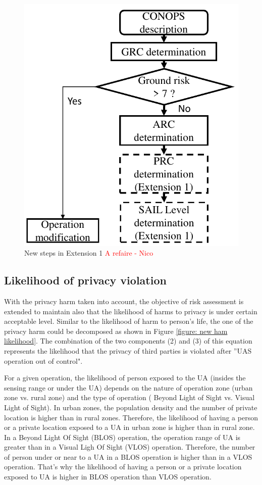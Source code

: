 \documentclass[a4paper, 10, conference]{ieeeconf}  %
\begin{document}
  \begin{figure}[!ht]
   	\centering
   	\includegraphics[width= 2.9 in]{image/Extended_Processs_in_module1.pdf}
   	\caption{New steps in Extension 1 \textcolor{red}{A refaire - Nico}}
   	\label{figure: New steps Ex1}
   \end{figure}  
   
\subsection {Likelihood of privacy violation}
With the privacy harm taken into account, the objective of risk assessment is extended to maintain also that the likelihood of harms to privacy is under certain acceptable level. Similar to the likelihood of harm to person's life, the one of the privacy harm could be decomposed as shown in Figure \ref{figure: new ham likelihood}. The combination of the two components (2) and (3) of this equation represents the likelihood that the privacy of third parties is violated after ''UAS operation out of control". 

For a given operation, the likelihood of person exposed to the UA (insides the sensing range or under the UA) depends on the nature of operation zone (urban zone vs. rural zone) and the type of operation ( Beyond Light of Sight vs. Visual Light of Sight). In urban zones, the population density and the number of private location is higher than in rural zones. Therefore, the likelihood of having a person or a private location exposed to a UA in urban zone is higher than in rural zone. In a Beyond Light Of Sight (BLOS) operation, the operation range of UA is greater than in a Visual Ligh Of Sight (VLOS) operation. Therefore, the number of person under or near to a UA in a BLOS operation is higher than in a VLOS operation. That's why  the likelihood of having a person or a private location exposed to UA is higher in BLOS operation than VLOS operation. 
\end{document}
